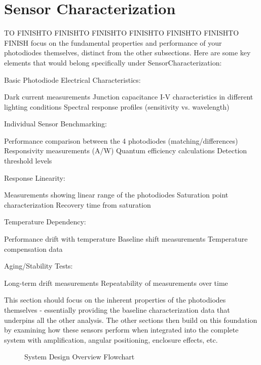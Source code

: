 \section{Sensor Characterization}
%
%
%
TO FINISHTO FINISHTO FINISHTO FINISHTO FINISHTO FINISHTO FINISH focus on the fundamental properties and performance of your photodiodes themselves, distinct from the other subsections. Here are some key elements that would belong specifically under SensorCharacterization:

Basic Photodiode Electrical Characteristics:

Dark current measurements
Junction capacitance
I-V characteristics in different lighting conditions
Spectral response profiles (sensitivity vs. wavelength)


Individual Sensor Benchmarking:

Performance comparison between the 4 photodiodes (matching/differences)
Responsivity measurements (A/W)
Quantum efficiency calculations
Detection threshold levels


Response Linearity:

Measurements showing linear range of the photodiodes
Saturation point characterization
Recovery time from saturation


Temperature Dependency:

Performance drift with temperature
Baseline shift measurements
Temperature compensation data


Aging/Stability Tests:

Long-term drift measurements
Repeatability of measurements over time



This section should focus on the inherent properties of the photodiodes themselves - essentially providing the baseline characterization data that underpins all the other analysis. The other sections then build on this foundation by examining how these sensors perform when integrated into the complete system with amplification, angular positioning, enclosure effects, etc.

\begin{figure}[H]
    \centering
    \scalebox{0.5}{ %
        
    }
    \caption{System Design Overview Flowchart}
    \label{fig:decriptiveLabel2} %
\end{figure}

